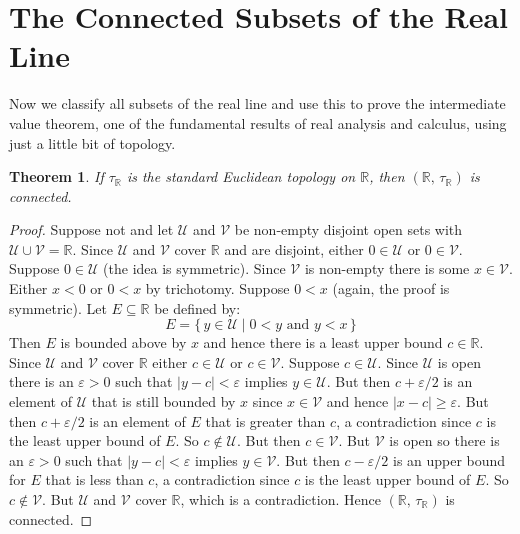 \documentclass{article}
\theoremstyle{plain}
\newtheorem{theorem}{Theorem}[section]
\theoremstyle{normal}
\begin{document}
    \section{The Connected Subsets of the Real Line}
        Now we classify all subsets of the real line and use this to prove
        the intermediate value theorem, one of the fundamental results of
        real analysis and calculus, using just a little bit of topology.
        \begin{theorem}
            If $\tau_{\mathbb{R}}$ is the standard Euclidean topology on
            $\mathbb{R}$, then $(\mathbb{R},\,\tau_{\mathbb{R}})$ is connected.
        \end{theorem}
        \begin{proof}
            Suppose not and let $\mathcal{U}$ and $\mathcal{V}$ be non-empty
            disjoint open sets with $\mathcal{U}\cup\mathcal{V}=\mathbb{R}$.
            Since $\mathcal{U}$ and $\mathcal{V}$ cover $\mathbb{R}$ and are
            disjoint, either $0\in\mathcal{U}$ or $0\in\mathcal{V}$. Suppose
            $0\in\mathcal{U}$ (the idea is symmetric). Since $\mathcal{V}$ is
            non-empty there is some $x\in\mathcal{V}$. Either $x<0$ or
            $0<x$ by trichotomy. Suppose $0<x$ (again, the proof is symmetric).
            Let $E\subseteq\mathbb{R}$ be defined by:
            \begin{equation}
                E=\{\,y\in\mathcal{U}\;|\;0<y\textrm{ and }y<x\,\}
            \end{equation}
            Then $E$ is bounded above by $x$ and hence there is a least
            upper bound $c\in\mathbb{R}$. Since $\mathcal{U}$ and $\mathcal{V}$
            cover $\mathbb{R}$ either $c\in\mathcal{U}$ or $c\in\mathcal{V}$.
            Suppose $c\in\mathcal{U}$. Since $\mathcal{U}$ is open there is an
            $\varepsilon>0$ such that $|y-c|<\varepsilon$ implies
            $y\in\mathcal{U}$. But then $c+\varepsilon/2$ is an element of
            $\mathcal{U}$ that is still bounded by $x$ since $x\in\mathcal{V}$
            and hence $|x-c|\geq\varepsilon$. But then $c+\varepsilon/2$ is an
            element of $E$ that is greater than $c$, a contradiction since $c$
            is the least upper bound of $E$. So $c\notin\mathcal{U}$. But then
            $c\in\mathcal{V}$. But $\mathcal{V}$ is open so there is an
            $\varepsilon>0$ such that $|y-c|<\varepsilon$ implies
            $y\in\mathcal{V}$. But then $c-\varepsilon/2$ is an upper bound for
            $E$ that is less than $c$, a contradiction since $c$ is the least
            upper bound of $E$. So $c\notin\mathcal{V}$. But $\mathcal{U}$ and
            $\mathcal{V}$ cover $\mathbb{R}$, which is a contradiction. Hence
            $(\mathbb{R},\,\tau_{\mathbb{R}})$ is connected.
         \end{proof}
\end{document}
